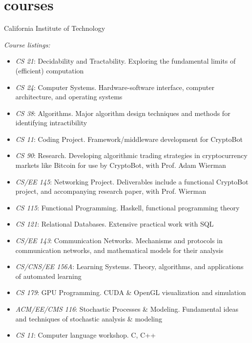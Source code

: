 \documentclass[]{mills-cv} %
\begin{document}
\newpage


\section{courses}

\begin{entrylist}
\entry
{}
{California Institute of Technology}
{}
{\emph{Course listings:}
\begin{itemize}
\item \emph{CS 21}: Decidability and Tractability. Exploring the fundamental limits of (efficient) computation
\item \emph{CS 24}: Computer Systems. Hardware-software interface, computer architecture, and operating systems
\item \emph{CS 38}: Algorithms. Major algorithm design techniques and methods for identifying intractibility
\item \emph{CS 11}: Coding Project. Framework/middleware development for CryptoBot
\item \emph{CS 90}: Research. Developing algorithmic trading strategies in cryptocurrency markets like Bitcoin for use by CryptoBot, with Prof. Adam Wierman
\item \emph{CS/EE 145}: Networking Project. Deliverables include a functional CryptoBot project, and accompanying research paper, with Prof. Wierman
\item \emph{CS 115}: Functional Programming. Haskell, functional programming theory
\item \emph{CS 121}: Relational Databases. Extensive practical work with SQL
\item \emph{CS/EE 143}: Communication Networks. Mechanisms and protocols in communication networks, and mathematical models for their analysis
\item \emph{CS/CNS/EE 156A}: Learning Systems. Theory, algorithms, and applications of automated learning
\item \emph{CS 179}: GPU Programming. CUDA \& OpenGL visualization and simulation
\item \emph{ACM/EE/CMS 116}: Stochastic Processes \& Modeling. Fundamental ideas and techniques of stochastic analysis \& modeling
\item \emph{CS 11}: Computer language workshop. C, C++
\end{itemize}}
\end{entrylist}
\end{document}
